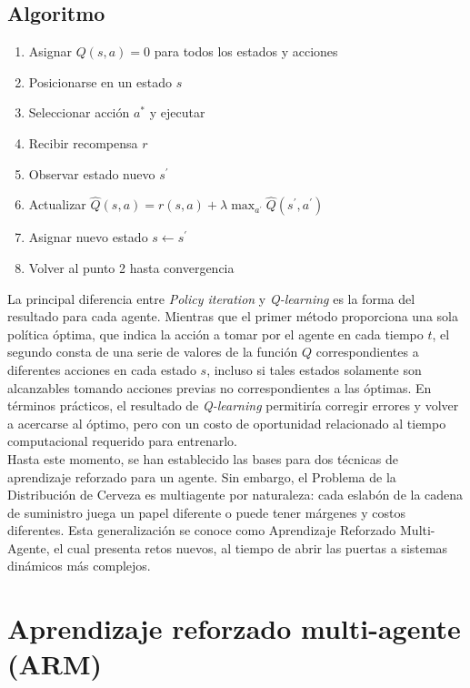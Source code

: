 \subsection{Algoritmo}

\begin{enumerate}
    \item Asignar $Q(s,a) = 0$ para todos los estados y acciones
    \item Posicionarse en un estado $s$
    \item Seleccionar acci\'on $a^{*}$ y ejecutar
    \item Recibir recompensa $r$
    \item Observar estado nuevo $s^{'}$
    \item Actualizar $\hat{Q}(s,a) = r(s,a) + \lambda \max _{ a^{'} }{  \hat{Q}(s^{'},a^{'}) }$
    \item Asignar nuevo estado $s \leftarrow s^{'}$
    \item Volver al punto 2 hasta convergencia
\end{enumerate}

La principal diferencia entre \textit{Policy iteration} y \textit{Q-learning} es la forma del resultado para cada agente. Mientras que el primer m\'etodo proporciona una sola pol\'itica \'optima, que indica la acci\'on a tomar por el agente en cada tiempo $t$, el segundo consta de una serie de valores de la funci\'on $Q$ correspondientes a diferentes acciones en cada estado $s$, incluso si tales estados solamente son alcanzables tomando acciones previas no correspondientes a las \'optimas. En t\'erminos pr\'acticos, el resultado de \textit{Q-learning} permitir\'ia corregir errores y volver a acercarse al \'optimo, pero con un costo de oportunidad relacionado al tiempo computacional requerido para entrenarlo.\\

Hasta este momento, se han establecido las bases para dos t\'ecnicas de aprendizaje reforzado para un agente. Sin embargo, el Problema de la Distribución de Cerveza es multiagente por naturaleza: cada eslab\'on de la cadena de suministro juega un papel diferente o puede tener m\'argenes y costos diferentes. Esta generalizaci\'on se conoce como Aprendizaje Reforzado Multi-Agente, el cual presenta retos nuevos, al tiempo de abrir las puertas a sistemas din\'amicos m\'as complejos.

\section{Aprendizaje reforzado multi-agente (ARM)}

